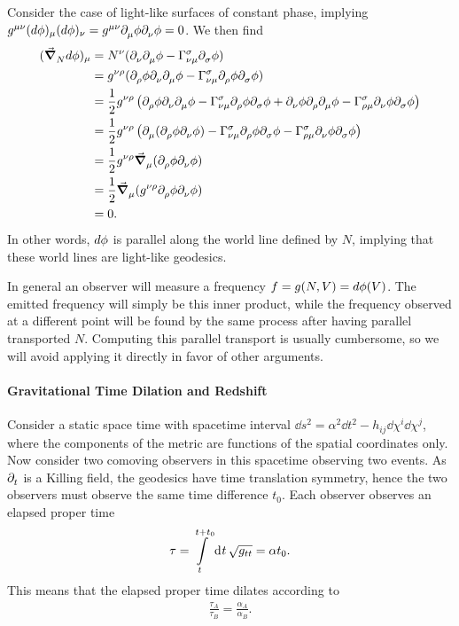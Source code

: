 Consider the case of light-like surfaces of constant phase, implying $g^{\mu\nu}(d\phi)_{\mu}(d\phi)_{\nu} = g^{\mu\nu}\partial^{}_{\mu}\phi\partial^{}_{\nu}\phi = 0$. We then find
\begin{align*}
	(\dcov{N}{\df{\phi}})_{\mu} &= N^{\nu}(\del{\nu}{\del{\mu}{\phi}} - \chris{\sigma}{\nu}{\mu}\del{\sigma}{\phi}) \\
	                            &= g^{\nu\rho}(\del{\rho}{\phi}\del{\nu}{\del{\mu}{\phi}} - \chris{\sigma}{\nu}{\mu}\del{\rho}{\phi}\del{\sigma}{\phi}) \\
	                            &= \frac{1}{2}g^{\nu\rho}\left(\del{\rho}{\phi}\del{\nu}{\del{\mu}{\phi}} - \chris{\sigma}{\nu}{\mu}\del{\rho}{\phi}\del{\sigma}{\phi} + \del{\nu}{\phi}\del{\rho}{\del{\mu}{\phi}} - \chris{\sigma}{\rho}{\mu}\del{\nu}{\phi}\del{\sigma}{\phi}\right) \\
	                            &= \frac{1}{2}g^{\nu\rho}\left(\del{\mu}{(\del{\rho}{\phi}\del{\nu}{\phi})} - \chris{\sigma}{\nu}{\mu}\del{\rho}{\phi}\del{\sigma}{\phi} - \chris{\sigma}{\rho}{\mu}\del{\nu}{\phi}\del{\sigma}{\phi}\right) \\
	                            &= \frac{1}{2}g^{\nu\rho}\dcov{\mu}{(\del{\rho}{\phi}\del{\nu}{\phi})} \\
	                            &= \frac{1}{2}\dcov{\mu}{(g^{\nu\rho}\del{\rho}{\phi}\del{\nu}{\phi})} \\
	                            &= 0.
\end{align*}
In other words, $d\phi$ is parallel along the world line defined by $N$, implying that these world lines are light-like geodesics.

In general an observer will measure a frequency $f = g(N, V) = d\phi(V)$. The emitted frequency will simply be this inner product, while the frequency observed at a different point will be found by the same process after having parallel transported $N$. Computing this parallel transport is usually cumbersome, so we will avoid applying it directly in favor of other arguments.

\paragraph{Gravitational Time Dilation and Redshift}
Consider a static space time with spacetime interval $\dd{s}^{2} = \alpha^{2}\dd{t}^{2} - h_{ij}\dd{\chi}^{i}\dd{\chi}^{j}$, where the components of the metric are functions of the spatial coordinates only. Now consider two comoving observers in this spacetime observing two events. As $\partial^{}_{t}$ is a Killing field, the geodesics have time translation symmetry, hence the two observers must observe the same time difference $t_{0}$. Each observer observes an elapsed proper time
\begin{align*}
	\tau = \int\limits_{t}^{t + t_{0}}\dd[]{t}\sqrt{g_{tt}} = \alpha t_{0}.
\end{align*}
This means that the elapsed proper time dilates according to
\begin{align*}
	\frac{\tau_{A}}{\tau_{B}} = \frac{\alpha_{A}}{\alpha_{B}}.
\end{align*}

